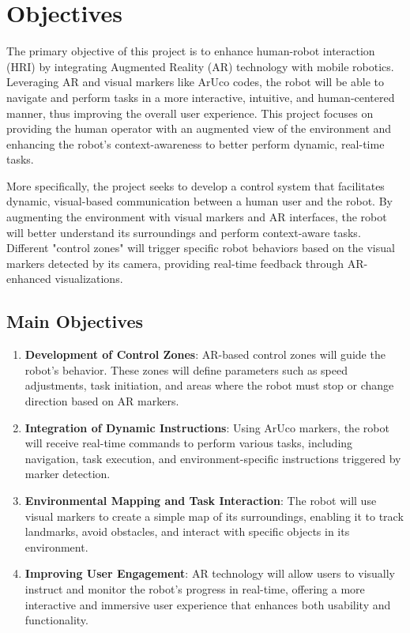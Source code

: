 
\section{\label{sec:objectives}Objectives}

The primary objective of this project is to enhance human-robot interaction (HRI) by integrating Augmented Reality (AR) technology with mobile robotics. Leveraging AR and visual markers like ArUco codes, the robot will be able to navigate and perform tasks in a more interactive, intuitive, and human-centered manner, thus improving the overall user experience. This project focuses on providing the human operator with an augmented view of the environment and enhancing the robot’s context-awareness to better perform dynamic, real-time tasks.

More specifically, the project seeks to develop a control system that facilitates dynamic, visual-based communication between a human user and the robot. By augmenting the environment with visual markers and AR interfaces, the robot will better understand its surroundings and perform context-aware tasks. Different "control zones" will trigger specific robot behaviors based on the visual markers detected by its camera, providing real-time feedback through AR-enhanced visualizations.

\subsection{Main Objectives}
\begin{enumerate}
    \item \textbf{Development of Control Zones}: AR-based control zones will guide the robot’s behavior. These zones will define parameters such as speed adjustments, task initiation, and areas where the robot must stop or change direction based on AR markers.
    \item \textbf{Integration of Dynamic Instructions}: Using ArUco markers, the robot will receive real-time commands to perform various tasks, including navigation, task execution, and environment-specific instructions triggered by marker detection.
    \item \textbf{Environmental Mapping and Task Interaction}: The robot will use visual markers to create a simple map of its surroundings, enabling it to track landmarks, avoid obstacles, and interact with specific objects in its environment.
    \item \textbf{Improving User Engagement}: AR technology will allow users to visually instruct and monitor the robot’s progress in real-time, offering a more interactive and immersive user experience that enhances both usability and functionality.
\end{enumerate}


